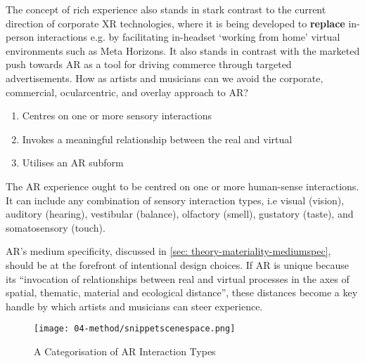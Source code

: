 The concept of rich experience also stands in stark contrast to the current direction of corporate XR technologies, where it is being developed to \textbf{replace} in-person interactions e.g. by facilitating in-headset `working from home' virtual environments such as Meta Horizons. It also stands in contrast with the marketed push towards AR as a tool for driving commerce through targeted advertisements. How as artists and musicians can we avoid the corporate, commercial, ocularcentric, and overlay approach to AR?

\begin{enumerate}
    \item Centres on one or more sensory interactions
    \item Invokes a meaningful relationship between the real and virtual
    \item Utilises an AR subform
\end{enumerate}
The AR experience ought to be centred on one or more human-sense interactions. It can include any combination of sensory interaction types, i.e visual (vision), auditory (hearing), vestibular (balance), olfactory (smell), gustatory (taste), and somatosensory (touch).

AR's medium specificity, discussed in \autoref{sec: theory-materiality-mediumspec}, should be at the forefront of intentional design choices. If AR is unique because its ``invocation of relationships between real and virtual processes in the axes of spatial, thematic, material and ecological distance'', these distances become a key handle by which artists and musicians can steer experience.


\begin{figure}
    \centering
    {\texttt{[image: 04-method/snippetscenespace.png]}}
    \caption[A Categorisation of AR Interaction Types]{A Categorisation of AR Interaction Types}
\end{figure}\label{fig: ARinteraction}

